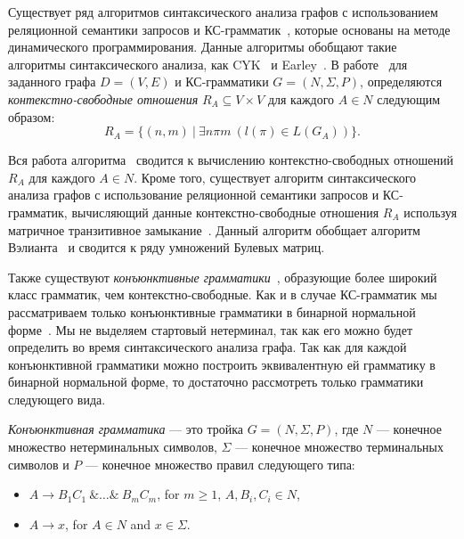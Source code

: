 \documentclass [a4paper] {article}
\begin{document}
	Существует ряд алгоритмов синтаксического анализа графов с использованием реляционной семантики запросов и КС-грамматик~\cite{hellingsRelational, RDF, GraphQueryWithEarley}, которые основаны на методе динамического программирования. Данные алгоритмы обобщают такие алгоритмы синтаксического анализа, как CYK~\cite{kasami, younger} и Earley~\cite{Grune}. В работе~\cite{hellingsRelational} для заданного графа $D = (V, E)$ и КС-грамматики $G = (N, \Sigma, P)$, определяются \textit{контекстно-свободные отношения} $R_A \subseteq V \times V$ для каждого $A \in N$ следующим образом: $$R_A = \{(n,m)~|~\exists n \pi m~(l(\pi) \in L(G_A))\}.$$
	
	Вся работа алгоритма~\cite{hellingsRelational} сводится к вычислению контекстно-свободных отношений $R_A$ для каждого $A \in N$. Кроме того, существует алгоритм синтаксического анализа графов с использование реляционной семантики запросов и КС-грамматик, вычисляющий данные контекстно-свободные отношения $R_A$ используя матричное транзитивное замыкание~\cite{azimov2018context}. Данный алгоритм обобщает алгоритм Вэлианта~\cite{valiant} и сводится к ряду умножений Булевых матриц.
	
	Также существуют \textit{конъюнктивные грамматики}~\cite{okhotin2001conjunctive}, образующие более широкий класс грамматик, чем контекстно-свободные. Как и в случае КС-грамматик мы рассматриваем только конъюнктивные грамматики в бинарной нормальной форме~\cite{okhotinConjAndBool}. Мы не выделяем стартовый нетерминал, так как его можно будет определить во время синтаксического анализа графа. Так как для каждой конъюнктивной грамматики можно построить эквивалентную ей грамматику в бинарной нормальной форме, то достаточно рассмотреть только грамматики следующего вида.
	
	\textit{Конъюнктивная грамматика} --- это тройка $G = (N, \Sigma, P)$, где $N$ --- конечное множество нетерминальных символов, $\Sigma$ --- конечное множество терминальных символов и $P$ --- конечное множество правил следующего типа:
	
	\begin{itemize}
		\item $A \rightarrow B_1 C_1~\& \ldots \&~B_m C_m$, for $m \geq 1$, $A,B_i,C_i \in N$,
		\item $A \rightarrow x$, for $A \in N$ and $x \in \Sigma$.   
	\end{itemize}
\end{document}
